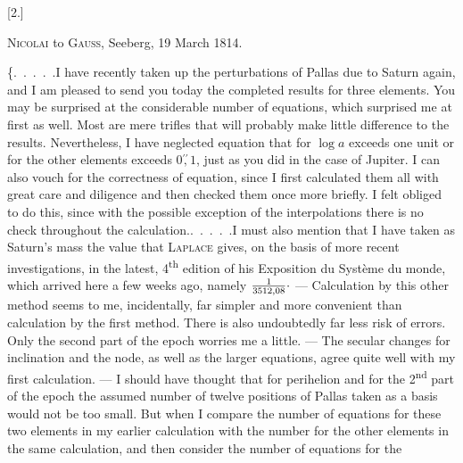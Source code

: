 \clearpage
\begingroup
{}
\renewcommand{\headrulewidth}{0pt}
\par\medskip
{}
\begin{center}
[2.]\par\medskip
\textsc{Nicolai} to \textsc{Gauss}, Seeberg, 19 March 1814.
\end{center}
\par\noindent\hspace*{\parindent}\{.\ .\ .\ .\ .\quad I have recently taken up the perturbations of Pallas
due to Saturn again, and I am pleased to send you today the completed results for three
elements. You may be surprised at
the considerable number of equations, which surprised me at first as well.
Most are mere trifles that will probably make little difference to the results.
Nevertheless, I have neglected  equation that for \(\log a\) exceeds
one unit or for the other elements exceeds \(0\overset{\prime\prime}{,}1\), just as
you did in the case of Jupiter. I can also vouch for the correctness of
 equation, since I first calculated them all with great care and
diligence and then checked them once more briefly. I
felt obliged to do this, since with the possible exception of the interpolations
there is no check throughout the calculation.\quad .\ .\ .\ .\ .\quad I must also mention
that I have taken as Saturn's mass the value that
\textsc{Laplace} gives, on the basis of more recent investigations, in the latest, 4\textsuperscript{th} edition of his
Exposition du Système du monde, which arrived here a few weeks ago,
namely \(\frac{1}{3512{,}08}\mathpunct{\raisebox{.45ex}{.}}\) --- Calculation by this other method
seems to me, incidentally, far simpler and more convenient than calculation by
the first method. There is also undoubtedly far less risk of errors.
Only the second part of the epoch worries me a little. --- The secular changes
for inclination and the node, as well as the larger equations,
agree quite well with my first calculation. --- I should have thought
that for perihelion and for the 2\textsuperscript{nd} part of the epoch the assumed
number of twelve positions of Pallas taken as a basis would not be
too small. But when I compare the number of equations for these two elements
in my earlier calculation with the number for the other elements in the same
calculation, and then consider the number of equations for the
